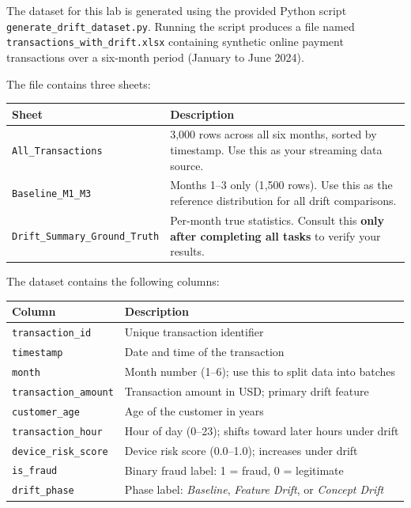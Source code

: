 \documentclass[12pt,a4paper]{article}
\begin{document}
The dataset for this lab is generated using the provided Python script \texttt{generate\_drift\_dataset.py}. Running the script produces a file named \texttt{transactions\_with\_drift.xlsx} containing synthetic online payment transactions over a six-month period (January to June 2024).

The file contains three sheets:

\renewcommand{\arraystretch}{1.6}
\begin{tabularx}{\textwidth}{|l|L|}
\hline
\textbf{Sheet} & \textbf{Description} \\
\hline
\texttt{All\_Transactions} & 3{,}000 rows across all six months, sorted by timestamp. Use this as your streaming data source. \\
\texttt{Baseline\_M1\_M3} & Months 1--3 only (1{,}500 rows). Use this as the reference distribution for all drift comparisons. \\
\texttt{Drift\_Summary\_Ground\_Truth} & Per-month true statistics. Consult this \textbf{only after completing all tasks} to verify your results. \\
\hline
\end{tabularx}
\renewcommand{\arraystretch}{1.0}

\vspace{8pt}

The dataset contains the following columns:

\renewcommand{\arraystretch}{1.6}
\begin{tabularx}{\textwidth}{|l|L|}
\hline
\textbf{Column} & \textbf{Description} \\
\hline
\texttt{transaction\_id} & Unique transaction identifier \\
\texttt{timestamp} & Date and time of the transaction \\
\texttt{month} & Month number (1--6); use this to split data into batches \\
\texttt{transaction\_amount} & Transaction amount in USD; primary drift feature \\
\texttt{customer\_age} & Age of the customer in years \\
\texttt{transaction\_hour} & Hour of day (0--23); shifts toward later hours under drift \\
\texttt{device\_risk\_score} & Device risk score (0.0--1.0); increases under drift \\
\texttt{is\_fraud} & Binary fraud label: 1 = fraud, 0 = legitimate \\
\texttt{drift\_phase} & Phase label: \textit{Baseline}, \textit{Feature Drift}, or \textit{Concept Drift} \\
\hline
\end{tabularx}
\renewcommand{\arraystretch}{1.0}
\end{document}
